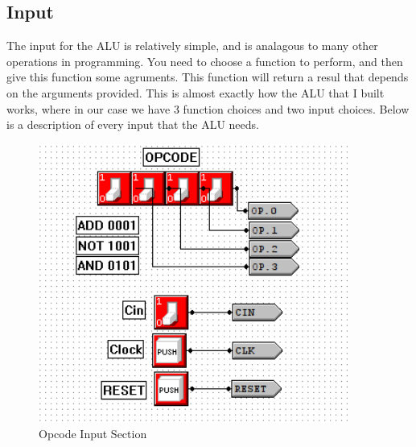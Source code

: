 \documentclass[a4paper,11pt]{article}
\begin{document}
\subsection{Input}
The input for the ALU is relatively simple, and is analagous to many other operations in programming. You need to choose a function to perform, and then give this function some agruments. This function will return a resul that depends on the arguments provided. This is almost exactly how the ALU that I built works, where in our case we have 3 function choices and two input choices. Below is a description of every input that the ALU needs.

   \begin{figure}
       \includegraphics[width=4in]{pictures/opcodeinput}
     \caption{Opcode Input Section}
     \label{fig:opcodeinput}
  \end{figure} 
\end{document}
